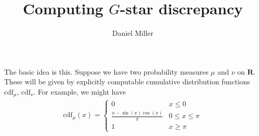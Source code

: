 \documentclass{article}
\title{Computing $G$-star discrepancy}
\author{Daniel Miller}
\newcommand{\bR}{\mathbf{R}}
\newcommand{\cdf}{\mathrm{cdf}}
\begin{document}
\maketitle





The basic idea is this. Suppose we have two probability measures 
$\mu$ and $\nu$ on $\bR$. These will be given by explicitly computable 
cumulative distribution functions $\cdf_\mu$, $\cdf_\nu$. For example, we might 
have 
\begin{align*}
	\cdf_\mu(x) = \begin{cases} 0 & x\leqslant 0 \\ \frac{x-\sin(x)\cos(x)}{\pi} & 0\leqslant x \leqslant \pi \\ 1 & x\geqslant \pi\end{cases}
\end{align*}
\end{document}
